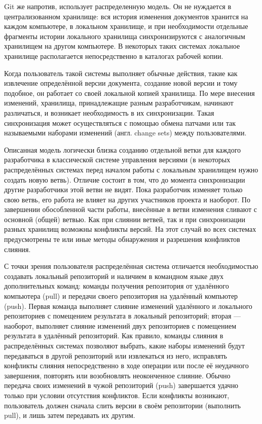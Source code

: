 Git же напротив, использует распределенную модель. Он не нуждается в централизованном хранилище:
вся история изменения документов хранится на каждом компьютере, в локальном хранилище, и при
необходимости отдельные фрагменты истории локального хранилища синхронизируются с аналогичным хранилищем
на другом компьютере. В некоторых таких системах локальное хранилище располагается непосредственно в
каталогах рабочей копии.

Когда пользователь такой системы выполняет обычные действия, такие как извлечение определённой
версии документа, создание новой версии и тому подобное, он работает со своей локальной копией
хранилища. По мере внесения изменений, хранилища, принадлежащие разным разработчикам, начинают
различаться, и возникает необходимость в их синхронизации. Такая синхронизация может осуществляться
с помощью обмена патчами или так называемыми наборами изменений (англ. change sets) между
пользователями.

Описанная модель логически близка созданию отдельной ветки для каждого разработчика в классической
системе управления версиями (в некоторых распределённых системах перед началом работы с локальным
хранилищем нужно создать новую ветвь). Отличие состоит в том, что до момента синхронизации другие
разработчики этой ветви не видят. Пока разработчик изменяет только свою ветвь, его работа не влияет
на других участников проекта и наоборот. По завершении обособленной части работы, внесённые в ветви
изменения сливают с основной (общей) ветвью. Как при слиянии ветвей, так и при синхронизации разных
хранилищ возможны конфликты версий. На этот случай во всех системах предусмотрены те или иные методы
обнаружения и разрешения конфликтов слияния.

С точки зрения пользователя распределённая система отличается необходимостью создавать локальный
репозиторий и наличием в командном языке двух дополнительных команд: команды получения репозитория
от удалённого компьютера (pull) и передачи своего репозитория на удалённый компьютер (push). Первая
команда выполняет слияние изменений удалённого и локального репозиториев с помещением результата в
локальный репозиторий; вторая — наоборот, выполняет слияние изменений двух репозиториев с помещением
результата в удалённый репозиторий. Как правило, команды слияния в распределённых системах позволяют
выбрать, какие наборы изменений будут передаваться в другой репозиторий или извлекаться из него,
исправлять конфликты слияния непосредственно в ходе операции или после её неудачного завершения,
повторять или возобновлять неоконченное слияние. Обычно передача своих изменений в чужой репозиторий
(push) завершается удачно только при условии отсутствия конфликтов. Если конфликты возникают, пользователь
должен сначала слить версии в своём репозитории (выполнить pull), и лишь затем передавать их другим.

